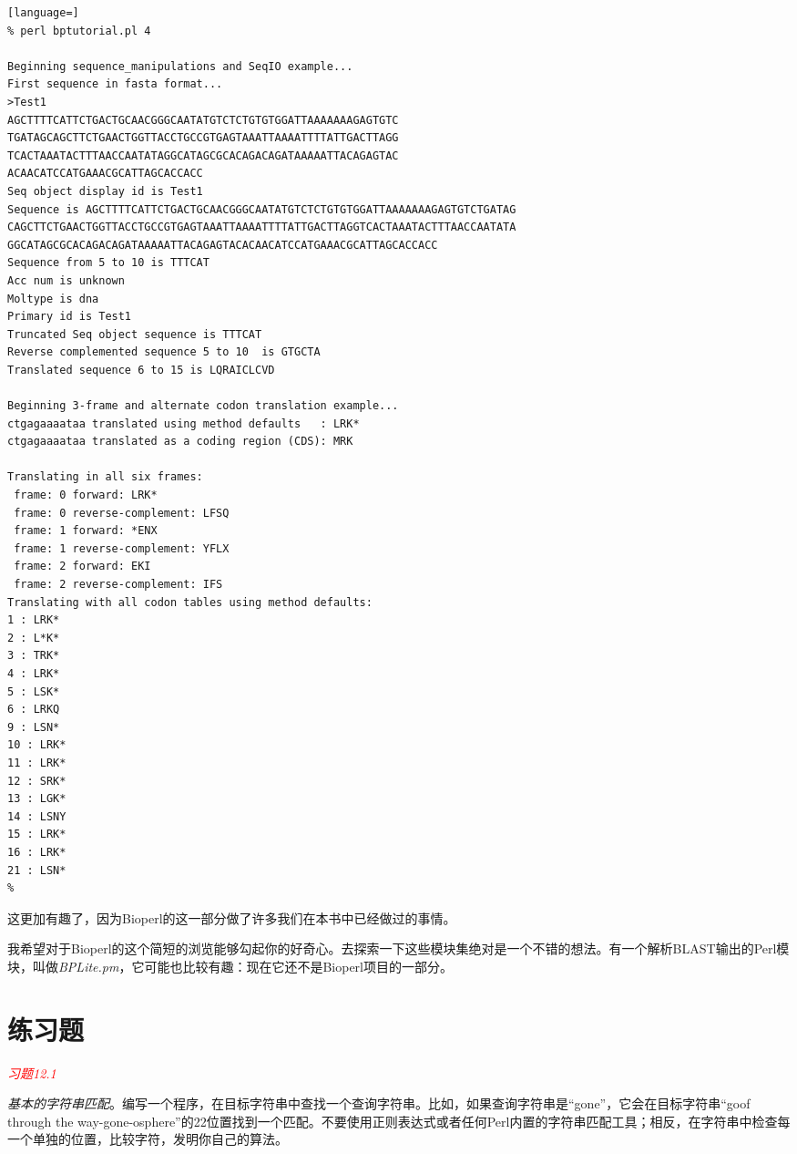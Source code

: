 \begin{lstlisting}[language=]
% perl bptutorial.pl 4

Beginning sequence_manipulations and SeqIO example... 
First sequence in fasta format... 
>Test1
AGCTTTTCATTCTGACTGCAACGGGCAATATGTCTCTGTGTGGATTAAAAAAAGAGTGTC
TGATAGCAGCTTCTGAACTGGTTACCTGCCGTGAGTAAATTAAAATTTTATTGACTTAGG
TCACTAAATACTTTAACCAATATAGGCATAGCGCACAGACAGATAAAAATTACAGAGTAC
ACAACATCCATGAAACGCATTAGCACCACC
Seq object display id is Test1
Sequence is AGCTTTTCATTCTGACTGCAACGGGCAATATGTCTCTGTGTGGATTAAAAAAAGAGTGTCTGATAG
CAGCTTCTGAACTGGTTACCTGCCGTGAGTAAATTAAAATTTTATTGACTTAGGTCACTAAATACTTTAACCAATATA
GGCATAGCGCACAGACAGATAAAAATTACAGAGTACACAACATCCATGAAACGCATTAGCACCACC 
Sequence from 5 to 10 is TTTCAT 
Acc num is unknown 
Moltype is dna 
Primary id is Test1 
Truncated Seq object sequence is TTTCAT 
Reverse complemented sequence 5 to 10  is GTGCTA  
Translated sequence 6 to 15 is LQRAICLCVD 

Beginning 3-frame and alternate codon translation example... 
ctgagaaaataa translated using method defaults   : LRK*
ctgagaaaataa translated as a coding region (CDS): MRK

Translating in all six frames:
 frame: 0 forward: LRK*
 frame: 0 reverse-complement: LFSQ
 frame: 1 forward: *ENX
 frame: 1 reverse-complement: YFLX
 frame: 2 forward: EKI
 frame: 2 reverse-complement: IFS
Translating with all codon tables using method defaults:
1 : LRK*
2 : L*K*
3 : TRK*
4 : LRK*
5 : LSK*
6 : LRKQ
9 : LSN*
10 : LRK*
11 : LRK*
12 : SRK*
13 : LGK*
14 : LSNY
15 : LRK*
16 : LRK*
21 : LSN*
% 
\end{lstlisting}

这更加有趣了，因为Bioperl的这一部分做了许多我们在本书中已经做过的事情。

我希望对于Bioperl的这个简短的浏览能够勾起你的好奇心。去探索一下这些模块集绝对是一个不错的想法。有一个解析BLAST输出的Perl模块，叫做\textit{BPLite.pm}，它可能也比较有趣：现在它还不是Bioperl项目的一部分。

\section{练习题}
\textcolor{red}{\textit{习题12.1}}
\begin{adjustwidth}{2em}{}
\textit{基本的字符串匹配}。编写一个程序，在目标字符串中查找一个查询字符串。比如，如果查询字符串是“gone”，它会在目标字符串“goof through the way-gone-osphere”的22位置找到一个匹配。不要使用正则表达式或者任何Perl内置的字符串匹配工具；相反，在字符串中检查每一个单独的位置，比较字符，发明你自己的算法。
\end{adjustwidth}

